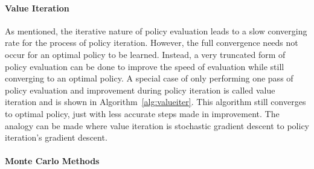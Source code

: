 

\paragraph*{Value Iteration}

As mentioned,
the iterative nature of policy evaluation leads to a slow converging rate
for the process of policy iteration.
%
However,
the full convergence needs not occur for an optimal policy to be learned.
%
Instead,
a very truncated form of policy evaluation can be done to improve the speed
of evaluation while still converging to an optimal policy.
%
A special case of only performing one pass of policy evaluation and improvement
during policy iteration is called value iteration
and is shown in Algorithm~\ref{alg:valueiter}. 
%
This algorithm still converges to optimal policy,
just with less accurate steps made in improvement.
%
The analogy can be made where value iteration is stochastic gradient descent
to policy iteration's gradient descent.



\paragraph*{Monte Carlo Methods}



